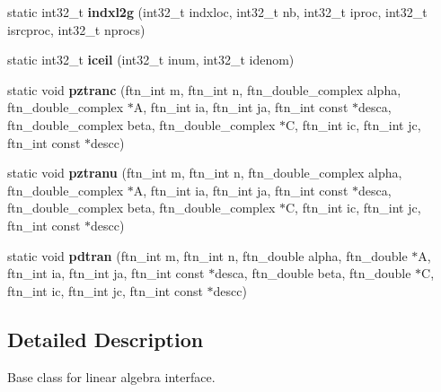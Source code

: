 \begin{DoxyCompactItemize}
\item 
\hypertarget{classsddk_1_1linalg__base_a4e68ca7d21ca9f4d00252832c9153775}{}static int32\+\_\+t {\bfseries indxl2g} (int32\+\_\+t indxloc, int32\+\_\+t nb, int32\+\_\+t iproc, int32\+\_\+t isrcproc, int32\+\_\+t nprocs)\label{classsddk_1_1linalg__base_a4e68ca7d21ca9f4d00252832c9153775}

\item 
\hypertarget{classsddk_1_1linalg__base_a3b3423b1ac9ca593d8600b9cbef39e21}{}static int32\+\_\+t {\bfseries iceil} (int32\+\_\+t inum, int32\+\_\+t idenom)\label{classsddk_1_1linalg__base_a3b3423b1ac9ca593d8600b9cbef39e21}

\item 
\hypertarget{classsddk_1_1linalg__base_a454fbf1523317db51978475582a5f409}{}static void {\bfseries pztranc} (ftn\+\_\+int m, ftn\+\_\+int n, ftn\+\_\+double\+\_\+complex alpha, ftn\+\_\+double\+\_\+complex $\ast$A, ftn\+\_\+int ia, ftn\+\_\+int ja, ftn\+\_\+int const $\ast$desca, ftn\+\_\+double\+\_\+complex beta, ftn\+\_\+double\+\_\+complex $\ast$C, ftn\+\_\+int ic, ftn\+\_\+int jc, ftn\+\_\+int const $\ast$descc)\label{classsddk_1_1linalg__base_a454fbf1523317db51978475582a5f409}

\item 
\hypertarget{classsddk_1_1linalg__base_a22a0b501dc01fcdc8381e3a0dcf82ace}{}static void {\bfseries pztranu} (ftn\+\_\+int m, ftn\+\_\+int n, ftn\+\_\+double\+\_\+complex alpha, ftn\+\_\+double\+\_\+complex $\ast$A, ftn\+\_\+int ia, ftn\+\_\+int ja, ftn\+\_\+int const $\ast$desca, ftn\+\_\+double\+\_\+complex beta, ftn\+\_\+double\+\_\+complex $\ast$C, ftn\+\_\+int ic, ftn\+\_\+int jc, ftn\+\_\+int const $\ast$descc)\label{classsddk_1_1linalg__base_a22a0b501dc01fcdc8381e3a0dcf82ace}

\item 
\hypertarget{classsddk_1_1linalg__base_aa783d5466047f26d93e831c0144c9399}{}static void {\bfseries pdtran} (ftn\+\_\+int m, ftn\+\_\+int n, ftn\+\_\+double alpha, ftn\+\_\+double $\ast$A, ftn\+\_\+int ia, ftn\+\_\+int ja, ftn\+\_\+int const $\ast$desca, ftn\+\_\+double beta, ftn\+\_\+double $\ast$C, ftn\+\_\+int ic, ftn\+\_\+int jc, ftn\+\_\+int const $\ast$descc)\label{classsddk_1_1linalg__base_aa783d5466047f26d93e831c0144c9399}

\end{DoxyCompactItemize}


\subsection{Detailed Description}
Base class for linear algebra interface. 

